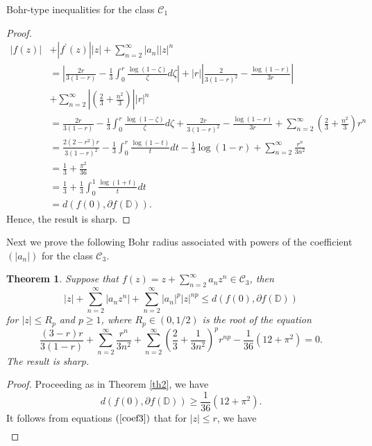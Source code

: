 \documentclass[12pt,a4paper,reqno]{amsart}
\theoremstyle{definition}
\theoremstyle{plain}
\newtheorem{theorem}[definition]{Theorem}
\numberwithin{equation}{section}
\begin{document}
\begin{section}{Bohr-type inequalities for the class $\mathcal{C}_1$}
\begin{proof}
\begin{align*}
|f(z)|& + |f^{'}(z)||z| + \sum_{n=2}^{\infty} |a_n| |z|^n\\
&= \left|\frac{2r}{3(1-r)} - \frac{1}{3} \int_{0}^{r} \frac{\log(1-\zeta)}{\zeta} d\zeta \right| + |r| \left| \frac{2}{3(1-r)^2}-\frac{\log(1-r)}{3r} \right|\\
  &+   \sum_{n=2}^{\infty} \left| \left( \frac{2}{3}+ \frac{n^2}{3}\right) \right| |r|^n\\
&= \frac{2r}{3(1-r)} - \frac{1}{3} \int_{0}^{r} \frac{\log(1-\zeta)}{\zeta} d\zeta  +   \frac{2r}{3(1-r)^2}-\frac{\log(1-r)}{3r}  +   \sum_{n=2}^{\infty}  \left( \frac{2}{3}+ \frac{n^2}{3}\right) r^n\\
&=\frac{2 (2-r^2) r}{3 (1-r)^2}-\frac{1}{3} \int_{0}^{r} \frac{\log(1-t)}{t} dt-\frac{1}{3} \log(1-r)+ \sum_{n=2}^{\infty} \frac{r^n}{3 n^2}\\
&=\frac{1}{3}+\frac{\pi ^2}{36}\\
&=\frac{1}{3} +\frac{1}{3} \int_{0}^{1} \frac{\log(1+t)}{t} dt\\
&=d(f(0), \partial{f(\mathbb{D})}).
\end{align*}
Hence, the result is sharp.
\end{proof}
\noindent
Next we prove the following Bohr radius associated with powers of the coefficient $(|a_n|)$ for the class $\mathcal{C}_3$.
\begin{theorem}
Suppose that $f(z)=z + \sum_{n=2}^{\infty} a_n z^n \in \mathcal{C}_3$, then
\begin{equation} \label{2.3.2}
|z|+ \sum_{n=2}^{\infty} |a_n z^n| + \sum_{n=2}^{\infty} |a_n|^{p} |z|^{np}  \le d(f(0), \partial{f(\mathbb{D})})
\end{equation}
for $|z| \le R_{p}$ and $p \ge 1$, where $R_{p}\in(0, 1/2)$ is the root of the equation
\begin{equation}\label{eq20}
\frac{(3-r) r}{3 (1-r)}+\sum_{n=2}^{\infty} \frac{r^n}{3 n^2}  + \sum_{n=2}^{\infty} \left( \frac{2}{3} + \frac{1}{3 n^2} \right)^p  r^{np}- \frac{1}{36} \left(12+\pi ^2\right)=0.
\end{equation}
The result is sharp.
\end{theorem}
\begin{proof}
Proceeding as in Theorem \ref{th2}, we have
\begin{equation}\label{eq18}
 d(f(0), \partial{f(\mathbb{D})}) \ge  \frac{1}{36} \left(12+\pi ^2\right).
\end{equation}
It follows from  equations $(\ref{coef3})$ that for $|z| \le r$, we have
\begin{align}\label{eq19}

\end{align}
\end{proof}
\end{section}
\end{document}
